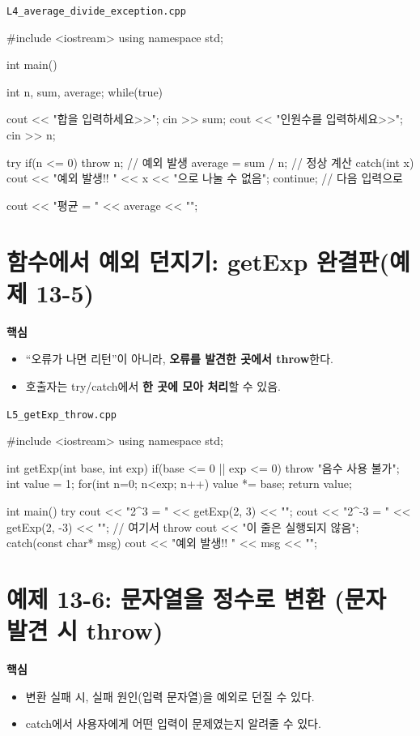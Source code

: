 \documentclass[11pt,a4paper]{article}
\newcommand{\filetag}[1]{\texttt{\color{Accent}#1}}
\begin{document}
\noindent\filetag{L4\_average\_divide\_exception.cpp}
\begin{cppcode}
#include <iostream>
using namespace std;

int main() {
    int n, sum, average;
    while(true) {
        cout << "합을 입력하세요>>";
        cin >> sum;
        cout << "인원수를 입력하세요>>";
        cin >> n;

        try {
            if(n <= 0) throw n;          // 예외 발생
            average = sum / n;           // 정상 계산
        }
        catch(int x) {
            cout << "예외 발생!! " << x << "으로 나눌 수 없음\n\n";
            continue;                    // 다음 입력으로
        }

        cout << "평균 = " << average << "\n\n";
    }
}
\end{cppcode}

\section{함수에서 예외 던지기: getExp 완결판(예제 13-5)}
\begin{GoalBox}
\textbf{핵심}
\begin{itemize}[leftmargin=18pt]
  \item ``오류가 나면 리턴''이 아니라, \textbf{오류를 발견한 곳에서 throw}한다.
  \item 호출자는 try/catch에서 \textbf{한 곳에 모아 처리}할 수 있음.
\end{itemize}
\end{GoalBox}

\noindent\filetag{L5\_getExp\_throw.cpp}
\begin{cppcode}
#include <iostream>
using namespace std;

int getExp(int base, int exp) {
    if(base <= 0 || exp <= 0) throw "음수 사용 불가";
    int value = 1;
    for(int n=0; n<exp; n++) value *= base;
    return value;
}

int main() {
    try {
        cout << "2^3 = " << getExp(2, 3) << "\n";
        cout << "2^-3 = " << getExp(2, -3) << "\n"; // 여기서 throw
        cout << "이 줄은 실행되지 않음\n";
    }
    catch(const char* msg) {
        cout << "예외 발생!! " << msg << "\n";
    }
}
\end{cppcode}

\section{예제 13-6: 문자열을 정수로 변환 (문자 발견 시 throw)}
\begin{GoalBox}
\textbf{핵심}
\begin{itemize}[leftmargin=18pt]
  \item 변환 실패 시, 실패 원인(입력 문자열)을 예외로 던질 수 있다.
  \item catch에서 사용자에게 어떤 입력이 문제였는지 알려줄 수 있다.
\end{itemize}
\end{GoalBox}
\end{document}
